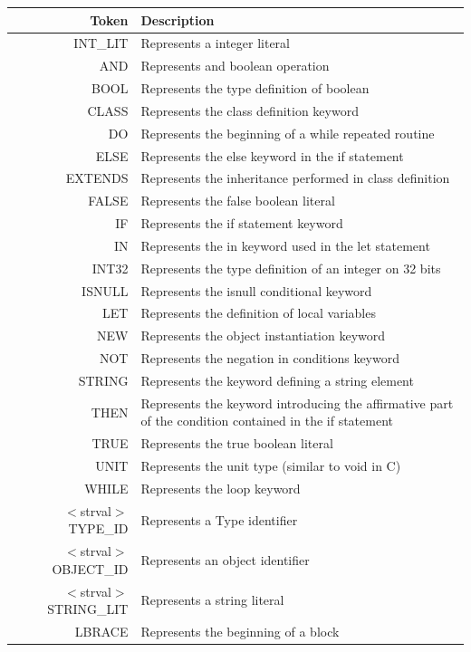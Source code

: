 \documentclass[a4paper,11pt]{article}
\begin{document}
    \begin{table}[hp]
      \centering
      \begin{tabular}{|r|p{10cm}|}
      \hline
      Token & Description\\\hline
      INT\_LIT & Represents a integer literal\\
      AND & Represents and boolean operation\\
      BOOL &Represents the type definition of boolean \\
      CLASS & Represents the class definition keyword\\
      DO & Represents the beginning of a while repeated routine\\
      ELSE & Represents the else keyword in the if statement\\
      EXTENDS & Represents the inheritance performed in class definition\\
      FALSE & Represents the false boolean literal \\
      IF & Represents the if statement keyword\\
      IN & Represents the in keyword used in  the let statement\\
      INT32 & Represents the type definition of an integer on 32 bits\\
      ISNULL & Represents the isnull conditional keyword\\
      LET & Represents the definition of local variables\\
      NEW & Represents the object instantiation keyword\\
      NOT & Represents the negation in conditions keyword\\
      STRING & Represents the keyword defining a string element\\
      THEN & Represents the keyword introducing the affirmative part of the condition contained in the if statement\\
      TRUE & Represents the true boolean literal\\
      UNIT & Represents the unit type (similar to void in C)\\
      WHILE & Represents the loop keyword\\
      $<$strval$>$ TYPE\_ID & Represents a Type identifier \\
      $<$strval$>$ OBJECT\_ID & Represents an object identifier\\
      $<$strval$>$ STRING\_LIT & Represents a string literal \\
      LBRACE & Represents the beginning of a block\\

\end{tabular}
\end{table}
\end{document}
